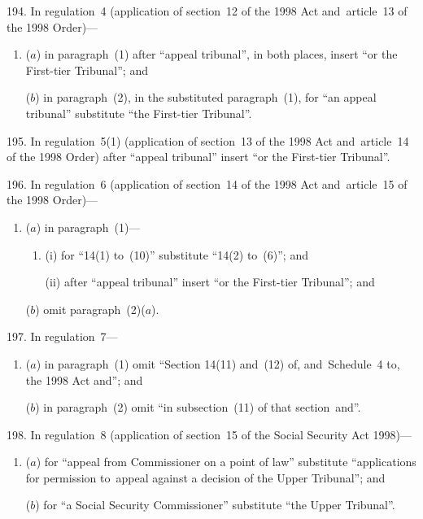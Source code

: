 \documentclass[12pt,a4paper]{article}
\begin{document}
\medskip

194.  In regulation~4 (application of section~12 of the 1998 Act and~article~13 of the 1998 Order)—
\begin{enumerate}\item[]
($a$) in paragraph~(1) after “appeal tribunal”, in both places, insert “or the First-tier Tribunal”; and

($b$) in paragraph~(2), in the substituted paragraph~(1), for “an appeal tribunal” substitute “the First-tier Tribunal”.
\end{enumerate}

\medskip

195.  In regulation~5(1) (application of section~13 of the 1998 Act and~article~14 of the 1998 Order) after “appeal tribunal” insert “or the First-tier Tribunal”.

\medskip

196.  In regulation~6 (application of section~14 of the 1998 Act and~article~15 of the 1998 Order)—
\begin{enumerate}\item[]
($a$) in paragraph~(1)—
\begin{enumerate}\item[]
(i) for “14(1) to~(10)” substitute “14(2) to~(6)”; and

(ii) after “appeal tribunal” insert “or the First-tier Tribunal”; and
\end{enumerate}

($b$) omit paragraph~(2)($a$).
\end{enumerate}

\medskip

197.  In regulation~7—
\begin{enumerate}\item[]
($a$) in paragraph~(1) omit “Section 14(11) and~(12) of, and~Schedule~4 to, the 1998 Act and”; and

($b$) in paragraph~(2) omit “in subsection~(11) of that section~and”.
\end{enumerate}

\medskip

198.  In regulation~8 (application of section~15 of the Social Security Act 1998)—
\begin{enumerate}\item[]
($a$) for “appeal from Commissioner on a point of law” substitute “applications for permission to~appeal against a decision of the Upper Tribunal”; and

($b$) for “a Social Security Commissioner” substitute “the Upper Tribunal”.
\end{enumerate}
\end{document}
